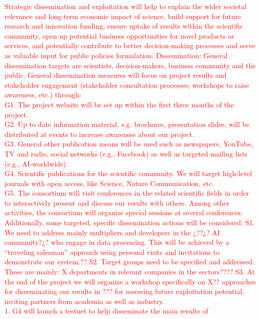 \documentclass[11pt, a4paper]{article} %
\begin{document}
{\textcolor{red}{Strategic dissemination and exploitation will help to
  explain the wider societal relevance and long-term economic impact
  of science, build support for future research and innovation
  funding, ensure uptake of results within the scientific community,
  open up potential business opportunities for novel products or
  services, and potentially contribute to better decision-making
  processes and serve as valuable input for public policies
  formulation.  Dissemination: General dissemination targets are
  scientists, decision-makers, business community and the public.
  General dissemination measures will focus on project results and
  stakeholder engagement (stakeholder consultation processes;
  workshops to raise awareness, etc.) through:
  \\
  G1. The project website will be set up within the first three months
  of the project.
  \\
  G2. Up to date information material, e.g. brochures, presentation
  slides, will be distributed at events to increase awareness about
  our project.
  \\
  G3. General other publication means will be used such as newspapers,
  YouTube, TV and radio, social networks (e.g., Facebook) as well as
  targeted mailing lists (e.g., AI-worldwide).
  \\
  G4. Scientific publications for the scientific community. We will
  target high-level journals with open access, like Science, Nature
  Communication, etc.
  \\
  G5. The consortium will visit conferences in the related scientific
  fields in order to interactively present and discuss our results
  with others. Among other activities, the consortium will organize
  special sessions at several conferences.  Additionally, some
  targeted, specific dissemination actions will be considered: S1. We
  need to address mainly multipliers and developers in the ¿??¿? AI
  community?¿?  who engage in data processing. This will be achieved
  by a “traveling salesman” approach using personal visits and
  invitations to demonstrate our system.??  S2. Target groups need to
  be specified and addressed.  These are mainly: X departments in
  relevant companies in the sectors????  S3. At the end of the project
  we will organize a workshop specifically on X?? approaches for
  disseminating our results in ??? for assessing future exploitation
  potential, inviting partners from academia as well as industry.
  \\
  1. G4 will launch a testnet to help disseminate the main results of
}}
\end{document}
